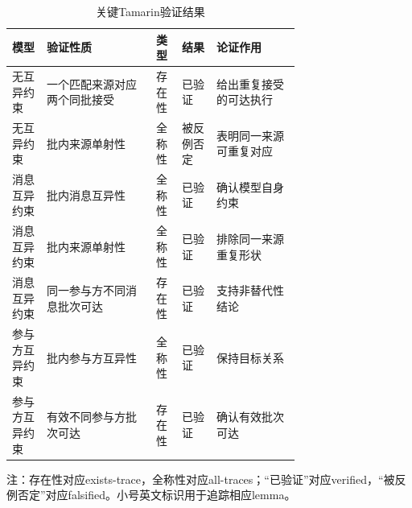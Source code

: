 \begin{table}[htbp]
  \centering
  \caption{关键Tamarin验证结果}
  \label{tab:key-verification-results}
  \footnotesize
  \begin{tabularx}{\linewidth}{@{}L{0.12\linewidth}L{0.38\linewidth}L{0.09\linewidth}L{0.12\linewidth}Y@{}}
    \toprule
    模型 & 验证性质 & 类型 & 结果 & 论证作用 \\
    \midrule
    无互异约束 & 一个匹配来源对应两个同批接受\newline
      {\scriptsize{}} & 存在性 & 已验证 & 给出重复接受的可达执行 \\
    无互异约束 & 批内来源单射性\newline
      {\scriptsize{}} & 全称性 & 被反例否定 & 表明同一来源可重复对应 \\
    \midrule
    消息互异约束 & 批内消息互异性\newline
      {\scriptsize{}} & 全称性 & 已验证 & 确认模型自身约束 \\
    消息互异约束 & 批内来源单射性\newline
      {\scriptsize{}} & 全称性 & 已验证 & 排除同一来源重复形状 \\
    消息互异约束 & 同一参与方不同消息批次可达\newline
      {\scriptsize{}} & 存在性 & 已验证 & 支持非替代性结论 \\
    \midrule
    参与方互异约束 & 批内参与方互异性\newline
      {\scriptsize{}} & 全称性 & 已验证 & 保持目标关系 \\
    参与方互异约束 & 有效不同参与方批次可达\newline
      {\scriptsize{}} & 存在性 & 已验证 & 确认有效批次可达 \\
    \bottomrule
  \end{tabularx}
  \par\smallskip
  \begin{minipage}{\linewidth}
    \scriptsize 注：存在性对应exists-trace，全称性对应all-traces；“已验证”对应verified，“被反例否定”对应falsified。小号英文标识用于追踪相应lemma。
  \end{minipage}
\end{table}

